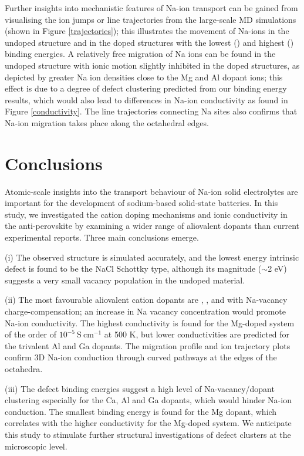 \documentclass[12pt]{report}
\begin{document}
Further insights into mechanistic features of Na-ion transport can be gained from visualising the ion jumps or line trajectories from the large-scale MD simulations (shown in Figure \ref{trajectories}); this illustrates the movement of Na-ions in the undoped structure and in the doped structures with the lowest () and highest () binding energies. 
A relatively free migration of Na ions can be found in the undoped structure with ionic motion slightly inhibited in the doped structures, as depicted by greater Na ion densities close to the Mg and Al dopant ions; this effect is due to a degree of defect clustering predicted from our binding energy results, which would also lead to differences in Na-ion conductivity as found in Figure \ref{conductivity}. 
The line trajectories connecting Na sites also confirms that Na-ion migration takes place along the  octahedral edges. 

\section{Conclusions}

Atomic-scale insights into the transport behaviour of Na-ion solid electrolytes are important for the development of sodium-based solid-state batteries. 
In this study, we investigated the cation doping mechanisms and ionic conductivity in the anti-perovskite  by examining a wider range of aliovalent dopants than current experimental reports. 
Three main conclusions emerge.

(i) The observed structure is simulated accurately, and the lowest energy intrinsic defect is found to be the NaCl Schottky type, although its magnitude ($\mathrm{\sim}$2 eV) suggests a very small vacancy population in the undoped material. 

(ii) The most favourable aliovalent cation dopants are , ,  and  with Na-vacancy charge-compensation; an increase in Na vacancy concentration would promote Na-ion conductivity. 
The highest conductivity is found for the Mg-doped system of the order of $\mathrm{10^{-5} \ S \ cm^{-1}}$ at 500 K, but lower conductivities are predicted for the trivalent Al and Ga dopants. 
The migration profile and ion trajectory plots confirm 3D Na-ion conduction through curved pathways at the edges of the  octahedra. 

(iii) The defect binding energies suggest a high level of Na-vacancy/dopant clustering especially for the Ca, Al and Ga dopants, which would hinder Na-ion conduction.  
The smallest binding energy is found for the Mg dopant, which correlates with the higher conductivity for the Mg-doped system. 
We anticipate this study to stimulate further structural investigations of defect clusters at the microscopic level. 
\end{document}
